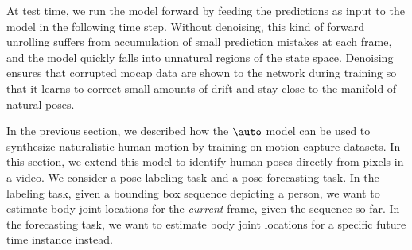 \documentclass[10pt,twocolumn,letterpaper]{article}
\begin{document}
At test time, we  run the model forward by feeding the predictions as input to the model in the following time step. Without  denoising, this kind of forward unrolling  suffers from accumulation of small prediction mistakes at each frame, and the model  
quickly falls into unnatural regions of the state space. 
Denoising ensures that corrupted mocap data are shown to the network during training so that it learns to  correct small amounts of drift and stay close to the manifold of natural poses.

In the previous section, we described how the $\auto$ model can be used to synthesize naturalistic human motion by training on  motion capture datasets. 
In this section, we extend this model to identify human poses directly from pixels in a video. We consider a pose labeling task and a pose forecasting task. In the labeling task, given a bounding box sequence depicting a person, we want to estimate body joint locations for the \textit{current} frame, given the sequence so far.
In the forecasting task, we want to estimate body joint locations for a specific future time instance instead.   
\end{document}
